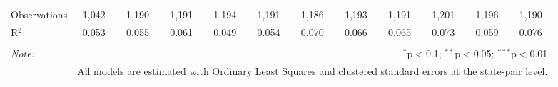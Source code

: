 \begin{table}[!htbp]
\begin{tabular}{@{\extracolsep{5pt}}lccccccccccc}
Observations & 1,042 & 1,190 & 1,191 & 1,194 & 1,191 & 1,186 & 1,193 & 1,191 & 1,201 & 1,196 & 1,190 \\ 
R$^{2}$ & 0.053 & 0.055 & 0.061 & 0.049 & 0.054 & 0.070 & 0.066 & 0.065 & 0.073 & 0.059 & 0.076 \\ 
\hline 
\hline \\[-1.8ex] 
\textit{Note:}  & \multicolumn{11}{r}{$^{*}$p$<$0.1; $^{**}$p$<$0.05; $^{***}$p$<$0.01} \\ 
 & \multicolumn{11}{r}{All models are estimated with Ordinary Least Squares and clustered standard errors at the state-pair level.} \\ 
\end{tabular} 
\end{table} 
